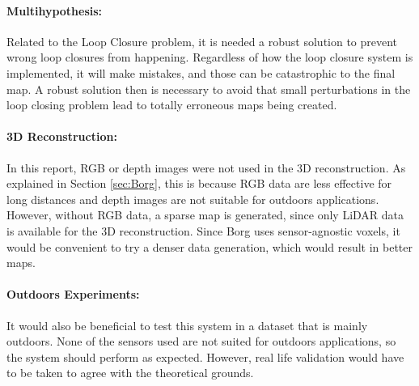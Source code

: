 \documentclass[12pt]{article}
\begin{document}
\paragraph{Multihypothesis: } Related to the Loop Closure problem, it is needed a robust solution to prevent wrong loop closures from happening. Regardless of how the loop closure system is implemented, it will make mistakes, and those can be catastrophic to the final map. A robust solution then is necessary to avoid that small perturbations in the loop closing problem lead to totally erroneous maps being created.
	
\paragraph{3D Reconstruction: } In this report, RGB or depth images were not used in the 3D reconstruction. As explained in Section \ref{sec:Borg}, this is because RGB data are less effective for long distances and depth images are not suitable for outdoors applications. However, without RGB data, a sparse map is generated, since only LiDAR data is available for the 3D reconstruction. Since Borg uses sensor-agnostic voxels, it would be convenient to try a denser data generation, which would result in better maps.
	
\paragraph{Outdoors Experiments: } It would also be beneficial to test this system in a dataset that is mainly outdoors. None of the sensors used are not suited for outdoors applications, so the system should perform as expected. However, real life validation would have to be taken to agree with the theoretical grounds.


		
	\newpage
	
	
\end{document}
